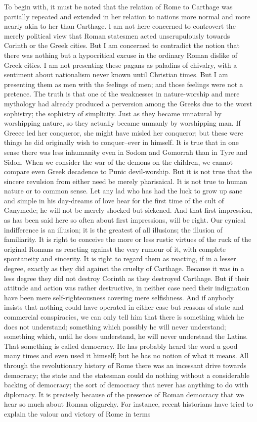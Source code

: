 To begin with, it must be noted that the relation of Rome to Carthage was partially repeated and extended in her relation to nations more normal and more nearly akin to her than Carthage. I am not here concerned to controvert the merely political view that Roman statesmen acted unscrupulously towards Corinth or the Greek cities. But I am concerned to contradict the notion that there was nothing but a hypocritical excuse in the ordinary Roman dislike of Greek cities. I am not presenting these pagans as paladins of chivalry, with a sentiment about nationalism never known until Christian times. But I am presenting them as men with the feelings of men; and those feelings were not a pretence. The truth is that one of the weaknesses in nature-worship and mere mythology had already produced a perversion among the Greeks due to the worst sophistry; the sophistry of simplicity. Just as they became unnatural by worshipping nature, so they actually became unmanly by worshipping man. If Greece led her conqueror, she might have misled her conqueror; but these were things he did originally wish to conquer--ever in himself. It is true that in one sense there was less inhumanity even in Sodom and Gomorrah than in Tyre and Sidon. When we consider the war of the demons on the children, we cannot compare even Greek decadence to Punic devil-worship. But it is not true that the sincere revulsion from either need be merely pharisaical. It is not true to human nature or to common sense. Let any lad who has had the luck to grow up sane and simple in his day-dreams of love hear for the first time of the cult of Ganymede; he will not be merely shocked but sickened. And that first impression, as has been said here so often about first impressions, will be right. Our cynical indifference is an illusion; it is the greatest of all illusions; the illusion of familiarity. It is right to conceive the more or less rustic virtues of the ruck of the original Romans as reacting against the very rumour of it, with complete spontaneity and sincerity. It is right to regard them as reacting, if in a lesser degree, exactly as they did against the cruelty of Carthage. Because it was in a less degree they did not destroy Corinth as they destroyed Carthage. But if their attitude and action was rather destructive, in neither case need their indignation have been mere self-righteousness covering mere selfishness. And if anybody insists that nothing could have operated in either case but reasons of state and commercial conspiracies, we can only tell him that there is something which he does not understand; something which possibly he will never understand; something which, until he does understand, he will never understand the Latins. That something is called democracy. He has probably heard the word a good many times and even used it himself; but he has no notion of what it means. All through the revolutionary history of Rome there was an incessant drive towards democracy; the state and the statesman could do nothing without a considerable backing of democracy; the sort of democracy that never has anything to do with diplomacy. It is precisely because of the presence of Roman democracy that we hear so much about Roman oligarchy. For instance, recent historians have tried to explain the valour and victory of Rome in terms 